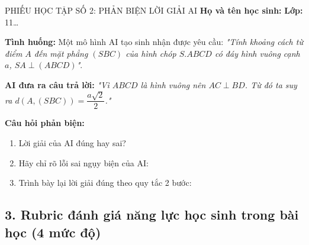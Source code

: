\documentclass[12pt, a4paper]{article}
\begin{document}
\begin{itemize}[leftmargin=1.2cm]
\begin{pedabox}{PHIẾU HỌC TẬP SỐ 2: PHẢN BIỆN LỜI GIẢI AI}
    \textbf{Họ và tên học sinh:} \dotfill \textbf{Lớp:} 11\dots

    \textbf{Tình huống:} Một mô hình AI tạo sinh nhận được yêu cầu: \textit{"Tính khoảng cách từ điểm $A$ đến mặt phẳng $(SBC)$ của hình chóp $S.ABCD$ có đáy hình vuông cạnh $a$, $SA \perp (ABCD)$"}.
    
    \textbf{AI đưa ra câu trả lời:} \textit{"Vì $ABCD$ là hình vuông nên $AC \perp BD$. Từ đó ta suy ra $d(A, (SBC)) = \dfrac{a\sqrt{2}}{2}$."}

    \textbf{Câu hỏi phản biện:}
    \begin{enumerate}
        \item Lời giải của AI đúng hay sai? \dotfill
        \item Hãy chỉ rõ lỗi sai ngụy biện của AI: \dotfill
        \item Trình bày lại lời giải đúng theo quy tắc 2 bước: \dotfill
    \end{enumerate}
\end{pedabox}

\subsection*{3. Rubric đánh giá năng lực học sinh trong bài học (4 mức độ)}


\end{itemize}
\end{document}
